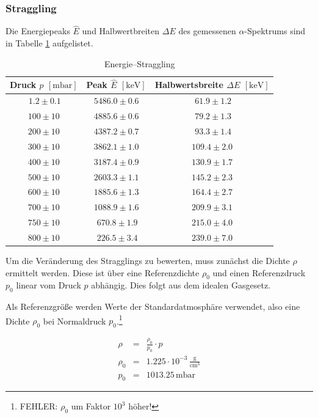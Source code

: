 \documentclass[12pt,a4paper]{scrartcl}
\numberwithin{equation}{section} %
\begin{document}
\hypertarget{energiestraggling-straggling}{%
	\subsubsection{Straggling}\label{energiestraggling-straggling}}
Die Energiepeaks $\hat E$ und Halbwertbreiten $\Delta E$ des gemessenen $\alpha$-Spektrums sind in Tabelle \ref{tabelle: Straggling} aufgelistet.
\begin{table}
	\centering
	\begin{tabular}[h]{||c|c|c||}
		\hline
		Druck $p$ $[\mathrm{mbar}]$ & Peak $\hat E$ $[\mathrm{keV}]$ & Halbwertsbreite $\Delta E$ $[\mathrm{keV}]$  \\
		\hline\hline
		$\ 1.2 \pm 0.1$ & $5486.0 \pm 0.6$ & $\ 61.9 \pm 1.2$ \\
		\hline
		$100 \pm 10$ & $4885.6 \pm 0.6$ & $\ 79.2 \pm 1.3$ \\
		\hline
		$200 \pm 10$ & $4387.2 \pm 0.7$ & $\ 93.3 \pm 1.4$ \\
		\hline
		$300 \pm 10$ & $3862.1 \pm 1.0$ & $109.4 \pm 2.0$ \\
		\hline
		$400 \pm 10$ & $3187.4 \pm 0.9$ & $130.9 \pm 1.7$ \\
		\hline
		$500 \pm 10$ & $2603.3 \pm 1.1$ & $145.2 \pm 2.3$ \\
		\hline
		$600 \pm 10$ & $1885.6 \pm 1.3$ & $164.4 \pm 2.7$ \\
		\hline
		$700 \pm 10$ & $1088.9 \pm 1.6$ & $209.9 \pm 3.1$ \\
		\hline
		$750 \pm 10$ & $\ 670.8 \pm 1.9$ & $215.0 \pm 4.0$ \\
		\hline
		$800 \pm 10$ & $\ 226.5 \pm 3.4$ & $239.0 \pm 7.0$ \\
		\hline
	\end{tabular}
	\caption{Energie--Straggling}
	\label{tabelle: Straggling}
\end{table}

Um die Veränderung des Stragglings zu bewerten, muss zunächst die Dichte $\rho$ ermittelt werden. Diese ist über eine Referenzdichte $\rho_0$ und einen Referenzdruck $p_0$ linear vom Druck $p$ abhängig.  Dies folgt aus dem idealen Gasgesetz.

Als Referenzgröße werden Werte der Standardatmosphäre verwendet, also eine Dichte $\rho_0$ bei Normaldruck $p_0$.\footnote{FEHLER: $\rho_0$ um Faktor $10^3$ höher!} \cite{DWD}

\begin{eqnarray}
	\rho &=& \frac{\rho_0}{p_0} \cdot p \\
	\rho_0 &=& 1.225 \cdot 10^{-3}\mathrm{\,\frac{g}{cm^3}} \label{eq:Normaldichte Luft} \\
	p_0 &=& 1013.25 \mathrm{\,mbar} \label{eq:Normaldruck Luft}
\end{eqnarray}
\end{document}
